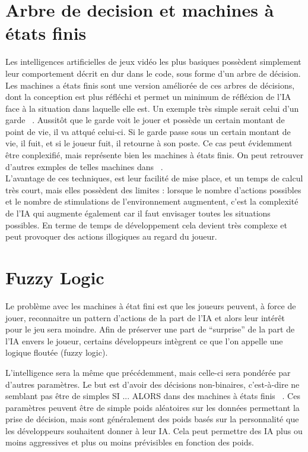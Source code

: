 \documentclass[asi]{picINSAIA}
\begin{document}
\section{Arbre de decision et machines à états finis}
Les intelligences artificielles de jeux vidéo les plus basiques possèdent simplement leur comportement décrit en dur dans le code, sous forme d’un arbre de décision. \\
Les machines a états finis sont une version améliorée de ces arbres de décisions, dont la conception est plus réfléchi et permet un minimum de réfléxion de l'IA face à la situation dans laquelle elle est. Un exemple très simple serait celui d'un garde ~\cite{MindGames}. Aussitôt que le garde voit le jouer et possède un certain montant de point de vie, il va attqué celui-ci. Si le garde passe sous un certain montant de vie, il fuit, et si le joueur fuit, il retourne à son poste. Ce cas peut évidemment être conplexifié, mais représente bien les machines à états finis. On peut retrouver d'autres exmples de telles machines dans ~\cite{khoo2002applying}.\\

L'avantage de ces techniques, est leur facilité de mise place, et un temps de calcul très court, mais elles possèdent des limites : lorsque le nombre d’actions possibles et le nombre de stimulations de l’environnement augmentent, c’est la complexité de l’IA qui augmente également car il faut envisager toutes les situations possibles. En terme de temps de développement cela devient très complexe et peut provoquer des actions illogiques au regard du joueur.

\section{Fuzzy Logic}
Le problème avec les machines à état fini est que les joueurs peuvent, à force de jouer, reconnaitre un pattern d'actions de la part de l'IA et alors leur intérêt pour le jeu sera moindre. Afin de préserver une part de ``surprise'' de la part de l'IA envers le joueur, certains développeurs intègrent ce que l'on appelle une logique floutée (fuzzy logic).

L'intelligence sera la même que précédemment, mais celle-ci sera pondérée par d'autres paramètres. Le but est d'avoir des décisions non-binaires, c'est-à-dire ne semblant pas être de simples SI ... ALORS dans des machines à états finis ~\cite{CompGamesWithIntel}.
Ces paramètres peuvent être de simple poids aléatoires sur les données permettant la prise de décision, mais sont généralement des poids basés sur la personnalité que les développeurs souhaitent donner à leur IA. Cela peut permettre des IA plus ou moins aggressives et plus ou moins prévisibles en fonction des poids.\\
\end{document}
